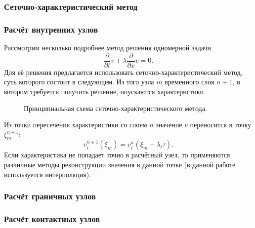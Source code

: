 \subsubsection{Сеточно-характеристический метод}


\subsubsection{Расчёт внутренних узлов}
Рассмотрим несколько подробнее метод решения одномерной задачи
\begin{equation}
\frac{\partial}{\partial t}v+\lambda \frac{\partial}{\partial x}v = 0.
\label{one_dim_eq}
\end{equation}
Для её решения предлагается использовать сеточно-характеристический метод, суть
которого состоит в следующем. Из того узла $m$ временного слоя $n+1$, в котором
требуется получить решение, опускаются характеристики.
\begin{figure}[h]
\caption{Принципиальная схема сеточно-характеристического метода.}
\end{figure}
Из точки пересечения характеристики со слоем $n$ значение $v$ переносится в 
точку $\xi^{n+1}_m$:
$$v_i^{n+1}(\xi_m)=v^{n}_i(\xi_m-\lambda_i\tau).$$
Если характеристика не попадает точно в расчётный узел, то применяются различные
методы реконструкции значения в данной точке (в данной работе используется
интерполяция).

\subsubsection{Расчёт граничных узлов}


\subsubsection{Расчёт контактных узлов}

